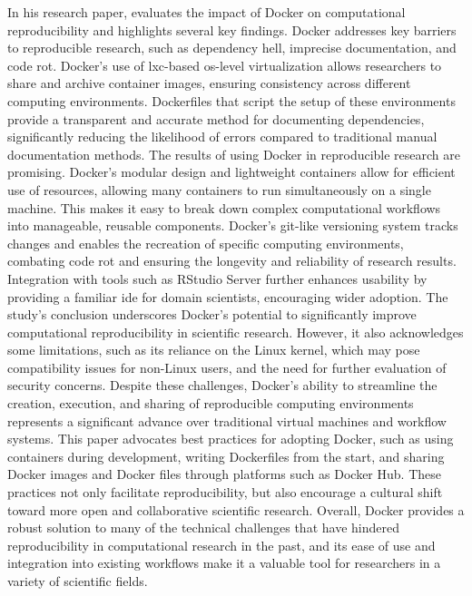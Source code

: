 In his research paper, \citet{boettigerIntroductionDockerReproducible2015} evaluates the impact of Docker on computational reproducibility and highlights several key findings.
Docker addresses key barriers to reproducible research, such as dependency hell, imprecise documentation, and code rot.
Docker's use of \ac{lxc}-based \ac{os}-level virtualization allows researchers to share and archive container images, ensuring consistency across different computing environments.
Dockerfiles that script the setup of these environments provide a transparent and accurate method for documenting dependencies, significantly reducing the likelihood of errors compared to traditional manual documentation methods.
The results of using Docker in reproducible research are promising.
Docker's modular design and lightweight containers allow for efficient use of resources, allowing many containers to run simultaneously on a single machine.
This makes it easy to break down complex computational workflows into manageable, reusable components.
Docker's git-like versioning system tracks changes and enables the recreation of specific computing environments, combating code rot and ensuring the longevity and reliability of research results.
Integration with tools such as RStudio Server further enhances usability by providing a familiar \ac{ide} for domain scientists, encouraging wider adoption.
The study's conclusion underscores Docker's potential to significantly improve computational reproducibility in scientific research.
However, it also acknowledges some limitations, such as its reliance on the Linux kernel, which may pose compatibility issues for non-Linux users, and the need for further evaluation of security concerns.
Despite these challenges, Docker's ability to streamline the creation, execution, and sharing of reproducible computing environments represents a significant advance over traditional virtual machines and workflow systems.
This paper advocates best practices for adopting Docker, such as using containers during development, writing Dockerfiles from the start, and sharing Docker images and Docker files through platforms such as Docker Hub.
These practices not only facilitate reproducibility, but also encourage a cultural shift toward more open and collaborative scientific research.
Overall, Docker provides a robust solution to many of the technical challenges that have hindered reproducibility in computational research in the past, and its ease of use and integration into existing workflows make it a valuable tool for researchers in a variety of scientific fields.

